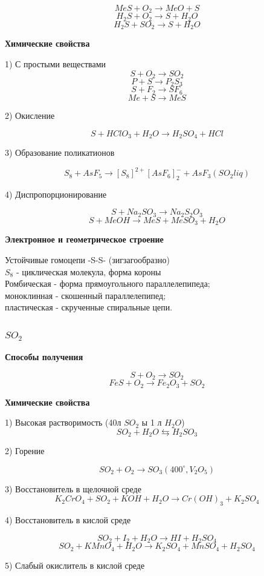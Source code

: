 \documentclass[14pt,a4paper]{scrartcl}
\begin{document}
$$MeS + O_2 \rightarrow MeO + S$$
$$H_2S + O_2 \rightarrow S + H_2O$$
$$H_2S + SO_2 \rightarrow S + H_2O$$

\textbf{Химические свойства}

1) С простыми веществами
$$S + O_2 \rightarrow SO_2$$
$$P + S \rightarrow P_2S_3$$
$$S+F_2 \rightarrow SF_6$$
$$Me + S \rightarrow MeS$$

2) Окисление

$$S + HClO_3 + H_2O \rightarrow H_2SO_4 + HCl$$

3) Образование поликатионов

$$S_8 + AsF_5 \rightarrow [S_8]^{2+}[AsF_6]_2^- + AsF_3(SO_2 liq)$$

4) Диспропорционирование

$$S + Na_2SO_3 \rightarrow Na_2S_2O_3$$
$$S + MeOH \rightarrow MeS + MeSO_3 + H_2O$$

\textbf{Электронное и геометрическое строение}

Устойчивые гомоцепи -S-S- (зигзагообразно)\\
$S_8$ - циклическая молекула, форма короны\\
Ромбическая - форма прямоугольного параллелепипеда;\\
моноклинная - скошенный параллелепипед;\\
пластическая - скрученные спиральные цепи.

\subsubsection{$SO_2$}

\textbf{Способы получения}

$$S + O_2 \rightarrow SO_2$$
$$FeS + O_2 \rightarrow Fe_2O_3 + SO_2$$

\textbf{Химические свойства}

1) Высокая растворимость (40л $SO_2$ ы 1 л $H_2O$)
$$SO_2 + H_2O \leftrightarrows H_2SO_3$$

2) Горение

$$SO_2 + O_2 \rightarrow SO_3(400^{\circ},V_2O_5)$$

3) Восстановитель в щелочной среде
$$K_2CrO_4 + SO_2 + KOH + H_2O \rightarrow Cr(OH)_3 + K_2SO_4$$

4) Восстановитель в кислой среде

$$SO_2 + I_2 + H_2O \rightarrow HI + H_2SO_4$$
$$SO_2 + KMnO_4 + H_2O \rightarrow K_2SO_4 + MnSO_4 + H_2SO_4$$

5) Слабый окислитель в кислой среде 
\end{document}
